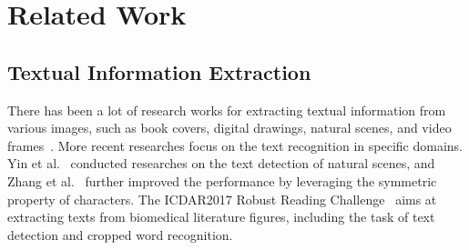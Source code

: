 \section{Related Work}
\label{sec:related}


\subsection{Textual Information Extraction}
There has been a lot of research works for
extracting textual information from various images, such as book covers,
digital drawings, natural scenes, and video frames~\cite{jung2004text}.
More recent researches focus on the text recognition in specific domains.
Yin et al.~ conducted researches on the text
detection of natural scenes,
and Zhang et al.~ further improved the
performance by leveraging the symmetric property of characters.
The ICDAR2017 Robust Reading Challenge~\cite{yang2017icdar2017}
aims at extracting texts from biomedical literature figures,
including the task of text detection and cropped word recognition.

